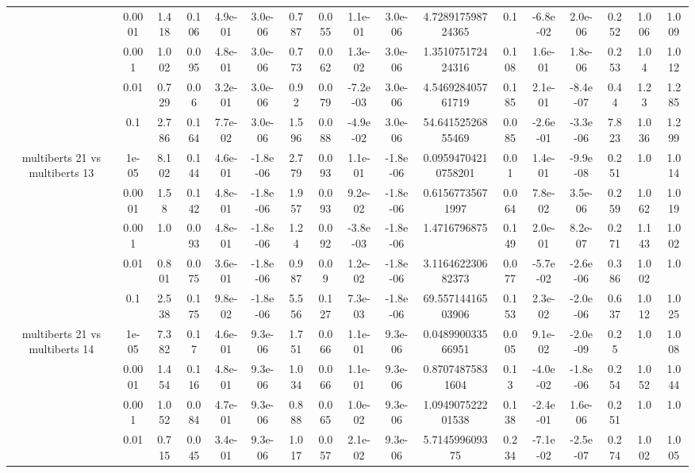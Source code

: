 \begin{tabular}{|c|c|c|c|c|c|c|c|c|c|c|c|c|c|c|c|c|}
 & 0.0001 & 1.418 & 0.106 & 4.9e-01 & 3.0e-06 & 0.787 & 0.055 & 1.1e-01 & 3.0e-06 & 4.728917598724365 & 0.1 & -6.8e-02 & 2.0e-06 & 0.252 & 1.006 & 1.009 \\
 & 0.001 & 1.002 & 0.095 & 4.8e-01 & 3.0e-06 & 0.773 & 0.062 & 1.3e-02 & 3.0e-06 & 1.351075172424316 & 0.108 & 1.6e-01 & 1.8e-06 & 0.253 & 1.04 & 1.012 \\
 & 0.01 & 0.729 & 0.06 & 3.2e-01 & 3.0e-06 & 0.92 & 0.079 & -7.2e-03 & 3.0e-06 & 4.546928405761719 & 0.185 & 2.1e-01 & -8.4e-07 & 0.44 & 1.23 & 1.285 \\
 & 0.1 & 2.786 & 0.164 & 7.7e-02 & 3.0e-06 & 1.596 & 0.088 & -4.9e-02 & 3.0e-06 & 54.64152526855469 & 0.085 & -2.6e-01 & -3.3e-06 & 7.823 & 1.036 & 1.299 \\
\hline
\multirow{5}{*}{multiberts 21 vs multiberts 13} & 1e-05 & 8.102 & 0.144 & 4.6e-01 & -1.8e-06 & 2.779 & 0.093 & 1.1e-01 & -1.8e-06 & 0.09594704210758201 & 0.01 & 1.4e-01 & -9.9e-08 & 0.251 & 1.0 & 1.014 \\
 & 0.0001 & 1.58 & 0.142 & 4.8e-01 & -1.8e-06 & 1.957 & 0.093 & 9.2e-02 & -1.8e-06 & 0.61567735671997 & 0.064 & 7.8e-02 & 3.5e-06 & 0.259 & 1.062 & 1.019 \\
 & 0.001 & 1.0 & 0.093 & 4.8e-01 & -1.8e-06 & 1.24 & 0.092 & -3.8e-03 & -1.8e-06 & 1.4716796875 & 0.149 & 2.0e-01 & 8.2e-07 & 0.271 & 1.143 & 1.002 \\
 & 0.01 & 0.801 & 0.075 & 3.6e-01 & -1.8e-06 & 0.987 & 0.09 & 1.2e-02 & -1.8e-06 & 3.116462230682373 & 0.077 & -5.7e-02 & -2.6e-06 & 0.386 & 1.002 & 1.0 \\
 & 0.1 & 2.538 & 0.175 & 9.8e-02 & -1.8e-06 & 5.556 & 0.127 & 7.3e-03 & -1.8e-06 & 69.55714416503906 & 0.153 & 2.3e-02 & -2.0e-06 & 0.637 & 1.012 & 1.025 \\
\hline
\multirow{5}{*}{multiberts 21 vs multiberts 14} & 1e-05 & 7.382 & 0.17 & 4.6e-01 & 9.3e-06 & 1.751 & 0.066 & 1.1e-01 & 9.3e-06 & 0.048990033566951 & 0.005 & 9.1e-02 & -2.0e-09 & 0.25 & 1.0 & 1.008 \\
 & 0.0001 & 1.454 & 0.116 & 4.8e-01 & 9.3e-06 & 1.034 & 0.066 & 1.1e-01 & 9.3e-06 & 0.87074875831604 & 0.13 & -4.0e-02 & -1.8e-06 & 0.254 & 1.052 & 1.044 \\
 & 0.001 & 1.052 & 0.084 & 4.7e-01 & 9.3e-06 & 0.888 & 0.065 & 1.0e-02 & 9.3e-06 & 1.094907522201538 & 0.138 & -2.4e-01 & 1.6e-06 & 0.251 & 1.0 & 1.0 \\
 & 0.01 & 0.715 & 0.045 & 3.4e-01 & 9.3e-06 & 1.017 & 0.057 & 2.1e-02 & 9.3e-06 & 5.714599609375 & 0.234 & -7.1e-02 & -2.5e-07 & 0.274 & 1.002 & 1.005 \\

\end{tabular}
